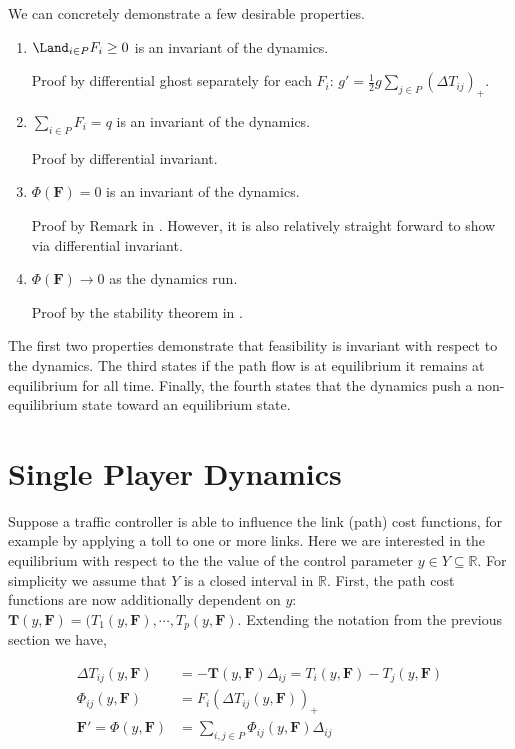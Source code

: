 We can concretely demonstrate a few desirable properties.

\begin{enumerate}
    \item $\Land_{i\in P} F_i \geq 0$ is an invariant of the dynamics.
        
        Proof by differential ghost separately for each $F_i$: $g' = \frac{1}{2}g \sum_{j\in P} (\Delta T_{ij})_+$.
    \item $\sum_{i\in P} F_i = q$ is an invariant of the dynamics.
    
        Proof by differential invariant.
    \item $\Phi(\mathbf{F}) = 0$ is an invariant of the dynamics.
        
        Proof by Remark in \citet{smith1984stability}. However, it is also relatively straight forward to show via differential invariant.
    \item $\Phi(\mathbf{F}) \to 0$ as the dynamics run.
    
        Proof by the stability theorem in \citet{smith1984stability}.
\end{enumerate}

The first two properties demonstrate that feasibility is invariant with respect to the dynamics.
The third states if the path flow is at equilibrium it remains at equilibrium for all time. Finally, the fourth states that the dynamics push a non-equilibrium state toward an equilibrium state.


\section{Single Player Dynamics}

Suppose a traffic controller is able to influence the link (path) cost functions, for example by applying a toll to one or more links.
Here we are interested in the equilibrium with respect to the the value of the control parameter $y\in Y \subseteq \mathbb{R}$.
For simplicity we assume that $Y$ is a closed interval in $\mathbb{R}$.
First, the path cost functions are now additionally dependent on $y$: $\mathbf{T}(y, \mathbf{F}) = (T_1(y,\mathbf{F}), \cdots, T_p(y, \mathbf{F})$.
Extending the notation from the previous section we have,

\begin{align}
    \Delta T_{ij}(y, \mathbf{F}) &= -\mathbf{T}(y, \mathbf{F})\Delta_{ij} = T_i(y, \mathbf{F}) - T_j(y, \mathbf{F})\\
    \Phi_{ij}(y, \mathbf{F}) &= F_i(\Delta T_{ij}(y, \mathbf{F}))_+\\
    \mathbf{F}' = \Phi(y, \mathbf{F}) &= \sum_{i,j \in P} \Phi_{ij}(y, \mathbf{F}) \Delta_{ij}
\end{align}

